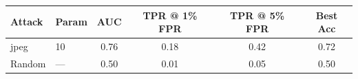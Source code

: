 \begin{tabular}{llcccc}
\toprule
Attack & Param & AUC & TPR @ 1\% FPR & TPR @ 5\% FPR & Best Acc \\
\midrule
jpeg & 10 & 0.76 & 0.18 & 0.42 & 0.72 \\
Random & — & 0.50 & 0.01 & 0.05 & 0.50 \\
\bottomrule
\end{tabular}
